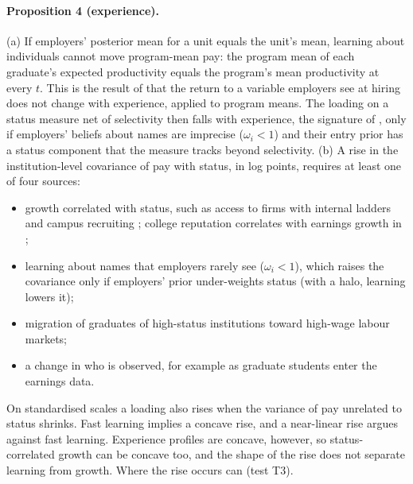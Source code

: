 \paragraph{Proposition 4 (experience).} (a) If employers' posterior mean for a unit equals the unit's mean,
learning about individuals cannot move program-mean pay: the program mean of each graduate's expected
productivity equals the program's mean productivity at every $t$. This is the result of \citet{farber1996learning}
that the return to a variable employers see at hiring does not change with experience, applied to program means.
The loading on a status measure net of selectivity then falls with experience, the signature of
\citet{altonji2001employer}, only if employers' beliefs about names are imprecise ($\omega_i<1$) and their entry
prior has a status component that the measure tracks beyond selectivity. (b) A rise in the institution-level
covariance of pay with status, in log points, requires at least one of four sources:
\begin{itemize}
\item growth correlated with status, such as access to firms with internal ladders and campus recruiting
\citep{gibbons1999theory,rivera2015pedigree,weinstein2018employer}; college reputation correlates with earnings
growth in \citet{macleod2017big};
\item learning about names that employers rarely see ($\omega_i<1$), which raises the covariance only if
employers' prior under-weights status (with a halo, learning lowers it);
\item migration of graduates of high-status institutions toward high-wage labour markets;
\item a change in who is observed, for example as graduate students enter the earnings data.
\end{itemize}
On standardised scales a loading also rises when the variance of pay unrelated to status shrinks. Fast learning
implies a concave rise, and a near-linear rise argues against fast learning. Experience profiles are concave,
however, so status-correlated growth can be concave too, and the shape of the rise does not separate learning
from growth. Where the rise occurs can (test T3).

